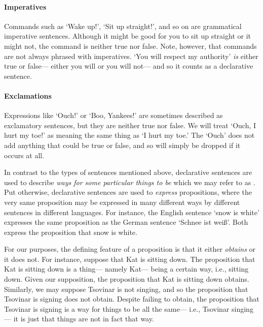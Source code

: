 \paragraph{Imperatives} Commands such as `Wake up!', `Sit up straight!', and so on are grammatical imperative sentences.
Although it might be good for you to sit up straight or it might not, the command is neither true nor false.
Note, however, that commands are not always phrased with imperatives.
`You will respect my authority' \emph{is} either true or false--- either you will or you will not--- and so it counts as a declarative sentence.

\paragraph{Exclamations} Expressions like `Ouch!' or `Boo, Yankees!' are sometimes described as exclamatory sentences, but they are neither true nor false.
We will treat `Ouch, I hurt my toe!' as meaning the same thing as `I hurt my toe.'
The `Ouch' does not add anything that could be true or false, and so will simply be dropped if it occurs at all.


In contrast to the types of sentences mentioned above, declarative sentences are used to describe \textit{ways for some particular things to be} which we may refer to as .
Put otherwise, declarative sentences are used to \textit{express} propositions, where the very same proposition may be expressed in many different ways by different sentences in different languages.
For instance, the English sentence `snow is white' expresses the same proposition as the German sentence `Schnee ist wei\ss'.
Both express the proposition that snow is white.

For our purposes, the defining feature of a proposition is that it either \textit{obtains} or it does not.
For instance, suppose that Kat is sitting down.
The proposition that Kat is sitting down is a thing--- namely Kat--- being a certain way, i.e., sitting down.
Given our supposition, the proposition that Kat is sitting down obtains.
Similarly, we may suppose Tsovinar is not singing, and so the proposition that Tsovinar is signing does not obtain.
Despite failing to obtain, the proposition that Tsovinar is signing is a way for things to be all the same--- i.e., Tsovinar singing--- it is just that things are not in fact that way.

